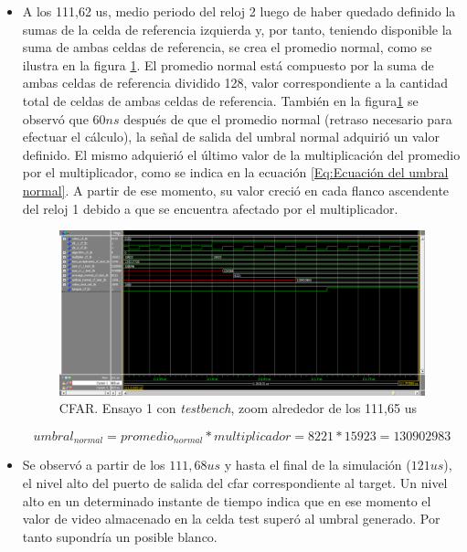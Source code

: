 \begin{itemize}
\item
A los 111,62 us, medio periodo del reloj 2 luego de haber quedado definido la sumas de la celda de referencia izquierda y, por tanto, teniendo disponible la suma de ambas celdas de referencia, se crea el promedio normal, como se ilustra en la figura \ref{fig:cfar_ensayo_1_zoom_umbral}. El promedio normal está compuesto por la suma de ambas celdas de referencia dividido 128, valor correspondiente a la cantidad total de celdas de ambas celdas de referencia. También en la figura\ref{fig:cfar_ensayo_1_zoom_umbral} se observó que $60 ns$ después de que el promedio normal (retraso necesario para efectuar el cálculo), la señal de salida del umbral normal adquirió un valor definido. El mismo adquierió el último valor de la multiplicación del promedio por el multiplicador, como se indica en la ecuación \ref{Eq:Ecuación del umbral normal}. A partir de ese momento, su valor creció en cada flanco ascendente del reloj 1 debido a que se encuentra afectado por el multiplicador.

\begin{figure}
\centering
\includegraphics[scale=0.52, angle=270]{./Figures/cfar_ensayo_1_zoom_umbral.png}
\caption{CFAR. Ensayo 1 con \textit{testbench}, zoom alrededor de los 111,65 us}
\label{fig:cfar_ensayo_1_zoom_umbral}
\end{figure}

\begin{equation}
umbral_{normal} = promedio_{normal} * multiplicador = 8221 * 15923 = 130902983
\label{Eq:Ecuación del umbral normal}
\end{equation}

\item
Se observó a partir de los $111,68 us$ y hasta el final de la simulación ($121 us$), el nivel alto del puerto de salida del cfar correspondiente al target. Un nivel alto en un determinado instante de tiempo indica que en ese momento el valor de video almacenado en la celda test superó al umbral generado. Por tanto supondría un posible blanco.

\end{itemize}



